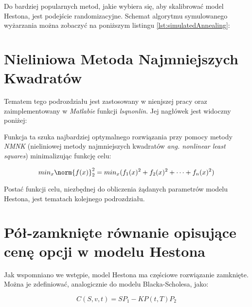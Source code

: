 \documentclass{pracamgr}
\begin{document}
Do bardziej popularnych metod, jakie wybiera się, aby skalibrować model Hestona, jest podejście randomizacyjne. Schemat algorytmu symulowanego wyżarzania można zobaczyć na poniższym listingu
\ref{lst:simulatedAnnealing}:



\section{Nieliniowa Metoda Najmniejszych Kwadratów}

Tematem tego podrozdziału jest zastosowany w nienjszej pracy oraz zaimplementowany w \textit{Matlabie} funkcji \textit{lsqnonlin}. Jej nagłówek jest widoczny poniżej:


Funkcja ta szuka najbardziej optymalnego rozwiązania przy pomocy metody \textit{NMNK} (nieliniowej metody najmniejszych kwadratów \textit{ang. nonlinear least squares}) minimalizując funkcję celu:

\begin{equation}
  min_x \norm{f(x)}^2_2 = min_x(f_1(x)^2 + f_2(x)^2 + \cdots + f_n(x)^2)
\end{equation}

Postać funkcji celu, niezbędnej do obliczenia żądanych parametrów modelu Hestona, jest tematach kolejnego podrozdziału.

\section{Pół-zamknięte równanie opisujące cenę opcji w modelu Hestona}

Jak wspomniano we wstępie, model Hestona ma częściowe rozwiązanie zamknięte. Można je zdefiniować, analogicznie do modelu Blacka-Scholesa, jako:

\begin{equation}
  C(S, v, t) = SP_1 -K P(t,T) P_2
\end{equation}
\end{document}
